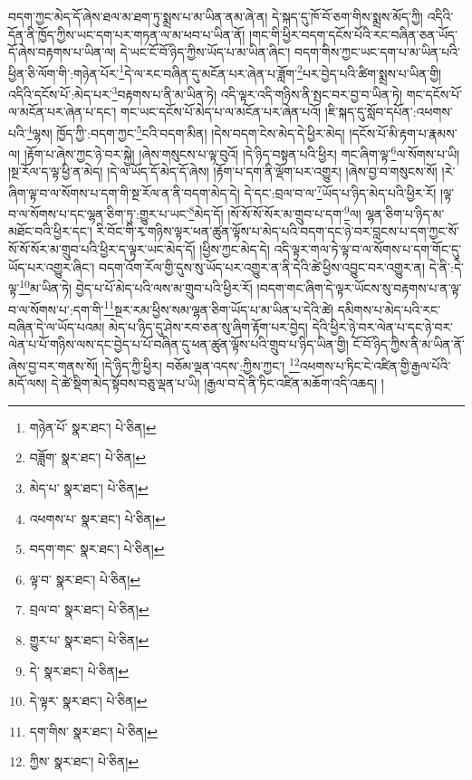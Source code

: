 བདག་ཀྱང་མེད་དོ་ཞེས་ཐལ་མ་ཐག་ཏུ་སྨྲས་པ་མ་ཡིན་ནམ་ཞེ་ན། དེ་སྐད་དུ་ཁོ་བོ་ཅག་གིས་སྨྲས་མོད་ཀྱི། འདིའི་དོན་ནི་ཁྱོད་ཀྱིས་ཡང་དག་པར་གཏན་ལ་མ་ཕབ་པ་ཡིན་ནོ། །གང་གི་ཕྱིར་བདག་དངོས་པོའི་རང་བཞིན་ཅན་ཡོད་དོ་ཞེས་བརྟགས་པ་ཡིན་ལ། དེ་ཡང་ངོ་བོ་ཉིད་ཀྱིས་ཡོད་པ་མ་ཡིན་ཞིང་། བདག་གིས་ཀྱང་ཡང་དག་པ་མ་ཡིན་པའི་ཕྱིན་ཅི་ལོག་གི་:གཉེན་པོར་\footnote{གཉེན་པོ་  སྣར་ཐང་།  པེ་ཅིན། }དེ་ལ་རང་བཞིན་དུ་མངོན་པར་ཞེན་པ་ཟློག་\footnote{བཟློག་  སྣར་ཐང་།  པེ་ཅིན། }པར་བྱེད་པའི་ཚིག་སྨྲས་པ་ཡིན་གྱི། འདིའི་དངོས་པོ་:མེད་པར་\footnote{མེད་པ་  སྣར་ཐང་།  པེ་ཅིན། }བརྟགས་པ་ནི་མ་ཡིན་ཏེ། འདི་ལྟར་འདི་གཉིས་ནི་སྤང་བར་བྱ་བ་ཡིན་ཏེ། གང་དངོས་པོ་ལ་མངོན་པར་ཞེན་པ་དང་། གང་ཡང་དངོས་པོ་མེད་པ་ལ་མངོན་པར་ཞེན་པའོ། །ཇི་སྐད་དུ་སློབ་དཔོན་:འཕགས་པའི་\footnote{འཕགས་པ་  སྣར་ཐང་།  པེ་ཅིན། }ལྷས། ཁྱོད་ཀྱི་:བདག་ཀྱང་\footnote{བདག་གང་  སྣར་ཐང་།  པེ་ཅིན། }ངའི་བདག་མིན། །དེས་བདག་ངེས་མེད་དེ་ཕྱིར་མེད། །དངོས་པོ་མི་རྟག་པ་རྣམས་ལ། །རྟོག་པ་ཞེས་ཀྱང་ཉེ་བར་སྐྱེ། །ཞེས་གསུངས་པ་ལྟ་བུའོ། །དེ་ཉིད་བསྟན་པའི་ཕྱིར། གང་ཞིག་ལྟ་\footnote{ལྟ་བ་  སྣར་ཐང་།  པེ་ཅིན། }ལ་སོགས་པ་ཡི། །སྔ་རོལ་ད་ལྟ་ཕྱི་ན་མེད། །དེ་ལ་ཡོད་དོ་མེད་དོ་ཞེས། །རྟོག་པ་དག་ནི་ལྡོག་པར་འགྱུར། །ཞེས་བྱ་བ་གསུངས་སོ། །རེ་ཞིག་ལྟ་བ་ལ་སོགས་པ་དག་གི་སྔ་རོལ་ན་ནི་བདག་མེད་དེ། དེ་དང་:བྲལ་བ་ལ་\footnote{བྲལ་བ་  སྣར་ཐང་།  པེ་ཅིན། }ཡོད་པ་ཉིད་མེད་པའི་ཕྱིར་རོ། །ལྟ་བ་ལ་སོགས་པ་དང་ལྷན་ཅིག་ཏུ་:གྱུར་པ་ཡང་\footnote{གྱུར་པ་  སྣར་ཐང་།  པེ་ཅིན། }མེད་དོ། །སོ་སོ་སོ་སོར་མ་གྲུབ་པ་དག་\footnote{དེ་  སྣར་ཐང་།  པེ་ཅིན། }ལ། ལྷན་ཅིག་པ་ཉིད་མ་མཐོང་བའི་ཕྱིར་དང་། རི་བོང་གི་རྭ་གཉིས་ལྟར་ཕན་ཚུན་ལྟོས་པ་མེད་པའི་བདག་དང་ཉེ་བར་བླངས་པ་དག་ཀྱང་སོ་སོ་སོ་སོར་མ་གྲུབ་པའི་ཕྱིར་ད་ལྟར་ཡང་མེད་དོ། །ཕྱིས་ཀྱང་མེད་དེ། འདི་ལྟར་གལ་ཏེ་ལྟ་བ་ལ་སོགས་པ་དག་གོང་དུ་ཡོད་པར་འགྱུར་ཞིང་། བདག་འོག་རོལ་གྱི་དུས་སུ་ཡོད་པར་འགྱུར་ན་ནི་དེའི་ཚེ་ཕྱིས་འབྱུང་བར་འགྱུར་ན། དེ་ནི་:དེ་ལྟ་\footnote{དེ་ལྟར་  སྣར་ཐང་།  པེ་ཅིན། }མ་ཡིན་ཏེ། བྱེད་པ་པོ་མེད་པའི་ལས་མ་གྲུབ་པའི་ཕྱིར་རོ། །བདག་གང་ཞིག་དེ་ལྟར་ཡོངས་སུ་བརྟགས་པ་ན་ལྟ་བ་ལ་སོགས་པ་:དག་གི་\footnote{དག་གིས་  སྣར་ཐང་།  པེ་ཅིན། }སྔར་རམ་ཕྱིས་སམ་ལྷན་ཅིག་ཡོད་པ་མ་ཡིན་པ་དེའི་ཚེ། དམིགས་པ་མེད་པའི་རང་བཞིན་དེ་ལ་ཡོད་པའམ། མེད་པ་ཉིད་དུ་ཤེས་རབ་ཅན་སུ་ཞིག་རྟོག་པར་བྱེད། དེའི་ཕྱིར་ཉེ་བར་ལེན་པ་དང་ཉེ་བར་ལེན་པ་པོ་གཉིས་ལས་དང་བྱེད་པ་པོ་བཞིན་དུ་ཕན་ཚུན་ལྟོས་པའི་གྲུབ་པ་ཉིད་ཡིན་གྱི། ངོ་བོ་ཉིད་ཀྱིས་ནི་མ་ཡིན་ནོ་ཞེས་བྱ་བར་གནས་སོ། །དེ་ཉིད་ཀྱི་ཕྱིར། བཅོམ་ལྡན་འདས་:ཀྱིས་ཀྱང་། \footnote{ཀྱིས་  སྣར་ཐང་།  པེ་ཅིན། }འཕགས་པ་ཏིང་ངེ་འཛིན་གྱི་རྒྱལ་པོའི་མདོ་ལས། དེ་ཚེ་སྡིག་མེད་སྟོབས་བཅུ་ལྡན་པ་ཡི། །རྒྱལ་བ་དེ་ནི་ཏིང་འཛིན་མཆོག་འདི་འཆད། །
